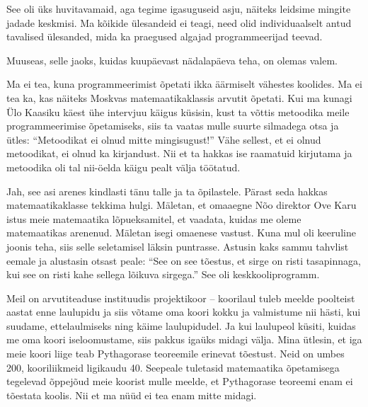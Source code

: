 
See oli üks huvitavamaid, aga tegime igasuguseid asju, näiteks leidsime mingite jadade keskmisi. Ma kõikide ülesandeid ei teagi, need olid individuaalselt antud tavalised ülesanded, mida ka praegused algajad 
programmeerijad teevad.

Muuseas, selle jaoks, kuidas kuupäevast nädalapäeva teha, on olemas valem. 


Ma ei tea, kuna programmeerimist õpetati ikka äärmiselt vähestes koolides. Ma ei 
tea ka, kas näiteks Moskvas matemaatikaklassis arvutit õpetati. Kui ma kunagi
Ülo Kaasiku käest ühe intervjuu käigus küsisin, 
kust ta võttis metoodika meile programmeerimise õpetamiseks, siis ta vaatas 
mulle suurte silmadega otsa ja ütles: \enquote{Metoodikat ei olnud mitte 
mingisugust!} Vähe sellest, et ei olnud metoodikat, ei olnud ka kirjandust. 
Nii et ta hakkas ise raamatuid kirjutama ja metoodika oli tal nii-öelda 
käigu pealt välja töötatud.


Jah, see asi arenes kindlasti tänu talle ja ta õpilastele. Pärast 
seda hakkas matemaatikaklasse tekkima hulgi. Mäletan, et omaaegne Nõo direktor Ove 
Karu istus meie matemaatika lõpueksamitel, et vaadata, kuidas me 
oleme matemaatikas arenenud. Mäletan isegi omaenese vastust. Kuna mul oli 
keeruline joonis teha, siis selle seletamisel läksin puntrasse. Astusin kaks 
sammu tahvlist eemale ja alustasin otsast peale: \enquote{See on see tõestus, et 
sirge on risti tasapinnaga, kui see on risti kahe sellega lõikuva sirgega.} See 
oli keskkooliprogramm. 

Meil on arvutiteaduse instituudis 
projektikoor -- koorilaul tuleb meelde poolteist aastat enne laulupidu ja siis 
võtame oma koori kokku ja valmistume nii hästi, kui suudame, ettelaulmiseks ning 
käime laulupidudel. Ja kui laulupeol küsiti, kuidas me oma koori 
iseloomustame, siis pakkus igaüks midagi välja. Mina ütlesin, et iga meie koori 
liige teab Pythagorase teoreemile erinevat tõestust. Neid on umbes 200, 
kooriliikmeid ligikaudu 40. Seepeale tuletasid matemaatika 
õpetamisega tegelevad õppejõud meie koorist mulle meelde, et 
Pythagorase teoreemi enam ei tõestata koolis. Nii et ma nüüd ei tea enam mitte 
midagi.

